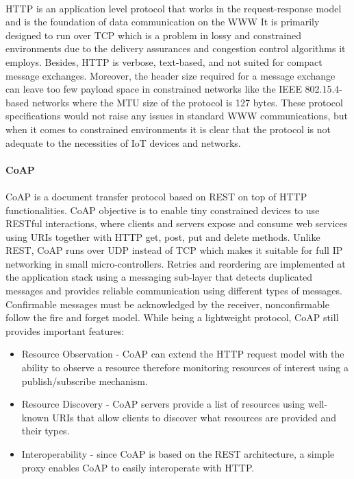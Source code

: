 \paragraph{}
	\ac{HTTP} is an application level protocol that works in the request-response model and is the foundation of data communication on the \ac{WWW} It is primarily designed to run over \ac{TCP} which is a problem in lossy and constrained environments due to the delivery assurances and congestion control algorithms it employs. Besides, {HTTP} is verbose, text-based, and not suited for compact message exchanges. Moreover, the header size required for a message exchange can leave too few payload space in constrained networks like the IEEE 802.15.4-based networks where the \ac{MTU} size of the protocol is 127 bytes. These protocol specifications would not raise any issues in standard \ac{WWW} communications, but when it comes to constrained environments it is clear that the protocol is not adequate to the necessities of \ac{IoT} devices and networks.

\paragraph{\textbf{\ac{CoAP}}}
\paragraph{}
	\ac{CoAP} is a document transfer protocol based on \ac{REST} on top of \ac{HTTP} functionalities. \ac{CoAP} objective is to enable tiny constrained devices to use RESTful interactions, where clients and servers expose and consume web services using \ac{URIs} together with  \ac{HTTP} get, post, put and delete methods. Unlike \ac{REST}, \ac{CoAP} runs over \ac{UDP} instead of \ac{TCP} which makes it suitable for full IP networking in small micro-controllers. Retries and reordering are implemented at the application stack using a messaging sub-layer that detects duplicated messages and provides reliable communication using different types of messages. Confirmable messages must be acknowledged by the receiver, nonconfirmable follow the fire and forget model. While being a lightweight protocol, \ac{CoAP} still provides important features:
	
\begin{itemize}
	\item Resource Observation - \ac{CoAP} can extend the \ac{HTTP} request model with the ability to observe a resource therefore monitoring resources of interest using a publish/subscribe mechanism.\\
	\item Resource Discovery - \ac{CoAP} servers provide a list of resources using well-known {URIs} that allow clients to discover what resources are provided and their types.\\
	\item Interoperability - since \ac{CoAP} is based on the \ac{REST} architecture, a simple proxy enables \ac{CoAP} to easily interoperate with \ac{HTTP}.
\end{itemize}

